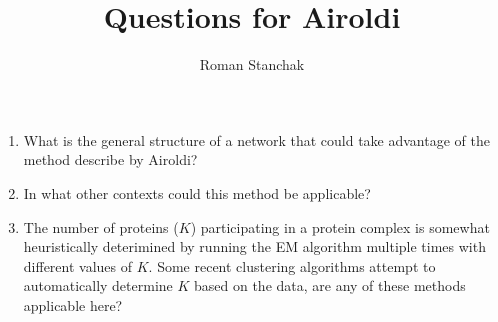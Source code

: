 \documentclass[11pt]{article}
\begin{document}
%
\title{Questions for Airoldi}
\author{Roman Stanchak}
\maketitle

\begin{enumerate}
\item What is the general structure of a network that could take advantage of
the method describe by Airoldi?

\item In what other contexts could this method be applicable?

\item The number of proteins ($K$) participating in a protein complex is somewhat
heuristically deterimined by running the EM algorithm multiple times with 
different values of $K$.  Some recent clustering algorithms attempt to
automatically determine $K$ based on the data, are any of these methods
applicable here?
\end{enumerate}
\end{document}
